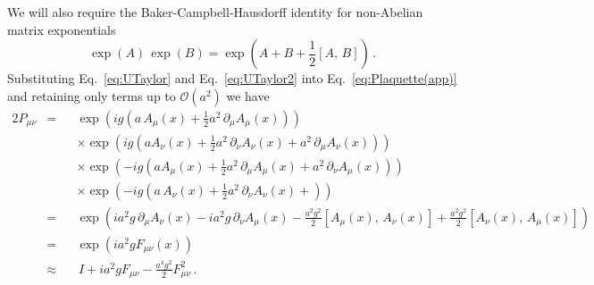 We will also require the Baker-Campbell-Hausdorff identity for non-Abelian matrix exponentials
%
\begin{equation}
\exp(A)\,\exp(B) = \exp\left(A + B +\frac{1}{2}[A,\,B]\right)\, .
\end{equation}
%
Substituting Eq.~\ref{eq:UTaylor} and Eq.~\ref{eq:UTaylor2} into Eq.~\ref{eq:Plaquette(app)} and retaining only terms up to $\mathcal{O}(a^2)$ we have
%
\begin{alignat*}{2}
P_{\mu\nu} &= &&\exp\left(ig\left(a\,A_\mu(x)+\frac{1}{2}a^2\,\partial_\mu A_\mu(x) \right)\right)\\
& &&\times\exp\left(ig\left(aA_\nu(x) + \frac{1}{2}a^2\,\partial_\nu A_\nu(x) + a^2\,\partial_\mu A_\nu(x)\right)\right)\\
& &&\times\exp\left(-ig\left(aA_\mu(x) + \frac{1}{2}a^2\,\partial_\mu A_\mu(x) + a^2\,\partial_\nu A_\mu(x)\right)\right)\\
& &&\times\exp\left(-ig\left(a\,A_\nu(x)+\frac{1}{2}a^2\,\partial_\nu A_\nu(x) + \right)\right)\\
&= &&\exp\left(ia^2g\,\partial_\mu A_\nu(x) - ia^2g\,\partial_\nu A_\mu(x) -\frac{a^2g^2}{2}[A_\mu(x),\,A_\nu(x)] + \frac{a^2g^2}{2}[A_\nu(x),\,A_\mu(x)]\right)\\
&= &&\exp\left(ia^2g F_{\mu\nu}(x)\right)\\
&\approx &&\, I + ia^2 g F_{\mu\nu} -\frac{a^4 g^2}{2} F_{\mu\nu}^2\, .
\end{alignat*}

